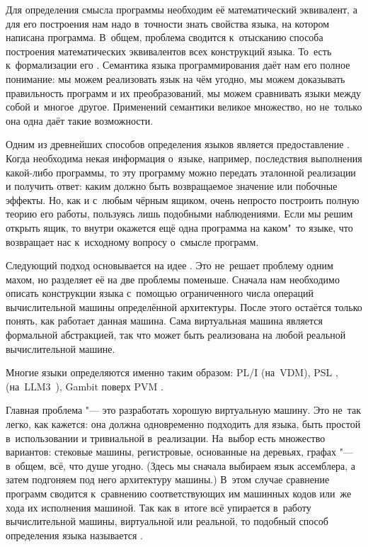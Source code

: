 Для определения смысла программы необходим её математический эквивалент, а для
его построения нам надо в~точности знать свойства языка, на котором написана
программа. В~общем, проблема сводится к~отысканию способа построения
математических эквивалентов всех конструкций языка. То~есть к~формализации его
. Семантика языка программирования даёт нам его полное
понимание: мы можем реализовать язык на чём угодно, мы можем доказывать
правильность программ и их преобразований, мы можем сравнивать языки между собой
и~многое~другое. Применений семантики великое множество, но не~только она одна
даёт такие возможности.

Одним из древнейших способов определения языков является предоставление
. Когда необходима некая информация о~языке,
например, последствия выполнения какой-либо программы, то эту программу можно
передать эталонной реализации и получить ответ: каким должно быть возвращаемое
значение или побочные эффекты. Но, как и с~любым чёрным ящиком, очень непросто
построить полную теорию его работы, пользуясь лишь подобными наблюдениями. Если
мы решим открыть ящик, то внутри окажется ещё одна программа на каком"~то языке,
что возвращает нас к~исходному вопросу о~смысле программ.

Следующий подход основывается на идее . Это не~решает
проблему одним махом, но разделяет её на две проблемы поменьше. Сначала нам
необходимо описать конструкции языка с~помощью ограниченного числа операций
вычислительной машины определённой архитектуры. После этого остаётся только
понять, как работает данная машина. Сама виртуальная машина является формальной
абстракцией, так что может быть реализована на любой реальной вычислительной
машине.

Многие языки определяются именно таким образом: PL/I (на~VDM), PSL \cite{gbm82},
{\LeLisp} (на~LLM3~\cite{cha80}), Gambit поверх PVM \cite{fm90}.

Главная проблема "--- это разработать хорошую виртуальную машину. Это не~так
легко, как кажется: она должна одновременно подходить для языка, быть простой
в~использовании и тривиальной в~реализации. На~выбор есть множество вариантов:
стековые машины, регистровые, основанные на деревьях, графах "--- в~общем, всё,
что душе угодно. (Здесь мы сначала выбираем язык ассемблера, а затем подгоняем
под него архитектуру машины.) В~этом случае сравнение программ сводится
к~сравнению соответствующих им машинных кодов или~же хода их исполнения машиной.
Так как в~итоге всё упирается в~работу вычислительной машины, виртуальной или
реальной, то подобный способ определения языка называется .

